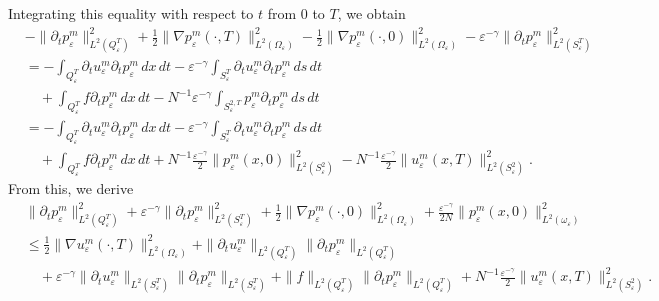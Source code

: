 \documentclass[reqno]{amsart}
\begin{document}
Integrating this equality with respect to $t$ from $0$ to $T$, we obtain
\begin{align*}
&-\| \partial _{t}p_{\varepsilon }^m\| _{L^2(Q_{\varepsilon
 }^{T})}^2+\frac{1}{2}\| \nabla p_{\varepsilon }^m(\cdot ,T)\|
 _{L^2(\Omega _{\varepsilon })}^2-\frac{1}{2}\| \nabla p_{\varepsilon
 }^m(\cdot ,0)\| _{L^2(\Omega _{\varepsilon })}^2-\varepsilon
 ^{-\gamma }\| \partial _{t}p_{\varepsilon }^m\|
_{L^2(S_{\varepsilon }^{T})}^2 \\
&=-\int _{Q_{\varepsilon }^{T}}\partial _{t}u_{\varepsilon
 }^m\partial _{t}p_{\varepsilon }^m\,dx\,dt-\varepsilon ^{-\gamma }\int
 _{S_{\varepsilon }^{T}}\partial _{t}u_{\varepsilon }^m\partial
 _{t}p_{\varepsilon }^m\,ds\,dt \\
&\quad +\int _{Q_{\varepsilon }^{T}}f\partial _{t}p_{\varepsilon }^m\,dx\,dt
 -N^{-1}\varepsilon ^{-\gamma }\int _{S_{\varepsilon
 }^{2,T}}p_{\varepsilon }^m\partial _{t}p_{\varepsilon }^m\,ds\,dt \\
&=-\int _{Q_{\varepsilon }^{T}}\partial _{t}u_{\varepsilon
 }^m\partial _{t}p_{\varepsilon }^m\,dx\,dt-\varepsilon ^{-\gamma }\int
 _{S_{\varepsilon }^{T}}\partial _{t}u_{\varepsilon }^m\partial
 _{t}p_{\varepsilon }^m\,ds\,dt \\
&\quad +\int _{Q_{\varepsilon }^{T}}f\partial _{t}p_{\varepsilon }^m\,dx\,dt
 +N^{-1}\frac{\varepsilon ^{-\gamma }}{2}\| p_{\varepsilon }^m(x,0)\|
 _{L^2(S_{\varepsilon }^2)}^2-N^{-1}\frac{\varepsilon ^{-\gamma }}{2}%
 \| u_{\varepsilon }^m(x,T)\| _{L^2(S_{\varepsilon }^2)}^2.
\end{align*}
From this, we derive
\begin{align*}
&\| \partial _{t}p_{\varepsilon }^m\| _{L^2(Q_{\varepsilon
 }^{T})}^2+\varepsilon ^{-\gamma }\| \partial _{t}p_{\varepsilon
 }^m\| _{L^2(S_{\varepsilon }^{T})}^2+\frac{1}{2}\| \nabla
 p_{\varepsilon }^m(\cdot ,0)\| _{L^2(\Omega _{\varepsilon })}^2+%
 \frac{\varepsilon ^{-\gamma }}{2N}\| p_{\varepsilon }^m(x,0)\|
 _{L^2(\omega _{\varepsilon })}^2 \\
&\leq \frac{1}{2}\| \nabla u_{\varepsilon }^m(\cdot ,T)\|
 _{L^2(\Omega _{\varepsilon })}^2+\| \partial _{t}u_{\varepsilon
 }^m\| _{L^2(Q_{\varepsilon }^{T})}\| \partial _{t}p_{\varepsilon
 }^m\| _{L^2(Q_{\varepsilon }^{T})} \\
&\quad +\varepsilon ^{-\gamma }\| \partial _{t}u_{\varepsilon }^m\|
 _{L^2(S_{\varepsilon }^{T})}\| \partial _{t}p_{\varepsilon }^m\|
 _{L^2(S_{\varepsilon }^{T})}+\| f\| _{L^2(Q_{\varepsilon
 }^{T})}\| \partial _{t}p_{\varepsilon }^m\| _{L^2(Q_{\varepsilon
 }^{T})} + N^{-1}\frac{\varepsilon^{-\gamma}}{2}\| u^m_\varepsilon(x, T)\|^2_{L^2(S^2_\varepsilon)}.
\end{align*}
\end{document}
